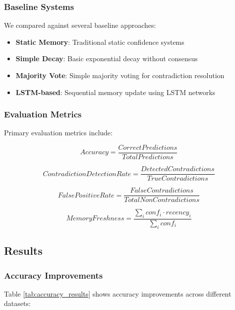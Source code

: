 \documentclass[12pt,a4paper]{article}
\begin{document}
\subsubsection{Baseline Systems}

We compared against several baseline approaches:

\begin{itemize}
\item \textbf{Static Memory}: Traditional static confidence systems
\item \textbf{Simple Decay}: Basic exponential decay without consensus
\item \textbf{Majority Vote}: Simple majority voting for contradiction resolution
\item \textbf{LSTM-based}: Sequential memory update using LSTM networks
\end{itemize}

\subsubsection{Evaluation Metrics}

Primary evaluation metrics include:

\begin{equation}
Accuracy = \frac{CorrectPredictions}{TotalPredictions}
\end{equation}

\begin{equation}
ContradictionDetectionRate = \frac{DetectedContradictions}{TrueContradictions}
\end{equation}

\begin{equation}
FalsePositiveRate = \frac{FalseContradictions}{TotalNonContradictions}
\end{equation}

\begin{equation}
MemoryFreshness = \frac{\sum_i conf_i \cdot recency_i}{\sum_i conf_i}
\end{equation}

\subsection{Results}

\subsubsection{Accuracy Improvements}

Table \ref{tab:accuracy_results} shows accuracy improvements across different datasets:
\end{document}
